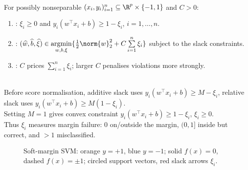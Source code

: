 \begin{definition} \label{def:sl-soft-margin-svm} \\
For possibly nonseparable $(x_i,y_i)_{i=1}^n\subseteq\R^p\times\{-1,1\}$ and $C>0$:
\begin{enumerate}[label=(\roman*)]
\setlength{\itemsep}{0pt}
\item {}: $\xi_i\geq0$ and $y_i(w^\top x_i+b)\geq1-\xi_i$, $i=1,\ldots,n$.
\item {}: $(\widehat{w},\widehat{b},\widehat{\xi})\in\operatorname*{argmin}\limits_{w,b,\xi}\{\frac12\norm{w}_2^2+C\sum\limits_{i=1}^n\xi_i\}$ subject to the slack constraints.
\item {}: $C$ prices $\sum\limits_{i=1}^n\xi_i$; larger $C$ penalises violations more strongly.
\end{enumerate}
\end{definition}

\begin{remark} \label{rem:sl-standard-slack-scaling} \\
Before score normalisation, additive slack uses $y_i(w^\top x_i+b)\geq M-\xi_i$, relative slack uses $y_i(w^\top x_i+b)\geq M(1-\xi_i)$.\\
Setting $M=1$ gives convex constraint $y_i(w^\top x_i+b)\geq1-\xi_i$, $\xi_i\geq0$.\\
Thus $\xi_i$ measures margin failure: $0$ on/outside the margin, $(0,1]$ inside but correct, and $>1$ misclassified.
\end{remark}

\begin{figure}[H]
\centering

\caption{Soft-margin SVM: \textcolor{orange!85!black}{orange} $y=+1$, \textcolor{cyan!70!blue}{blue} $y=-1$; solid $f(x)=0$, dashed $f(x)=\pm1$; circled support vectors, \textcolor{red!70!black}{red} slack arrows $\xi_i$.}
\label{fig:sl-svm-soft-margin-geometry}
\end{figure}

